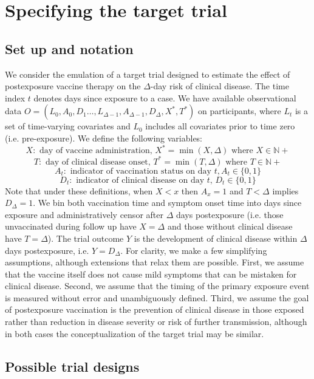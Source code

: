 \documentclass[11pt]{article}
\begin{document}

\section{Specifying the target trial}

\subsection{Set up and notation} \label{sec:setup}
We consider the emulation of a target trial designed to estimate the effect of postexposure vaccine therapy on the $\Delta$-day risk of clinical disease. The time index $t$ denotes days since exposure to a case. We have available observational data $O=\left(L_0, A_0, D_1 \ldots, L_{\Delta-1}, A_{\Delta-1}, D_{\Delta}, X^*, T^*\right)$ on participants, where $L_t$ is a set of time-varying covariates and $L_0$ includes all covariates prior to time zero (i.e. pre-exposure). We define the following variables:
$$X: \text{ day of vaccine administration, } X^* = \operatorname{min}(X, \Delta) \text{ where } X \in \mathbb{N}+$$
$$T: \text{ day of clinical disease onset, } T^* = \operatorname{min}(T, \Delta) \text{ where } T \in \mathbb{N}+$$
$$A_t: \text{ indicator of vaccination status on day }t, A_t \in \{0, 1\}$$
$$D_t: \text{ indicator of clinical disease on day $t$, } D_t \in \{0, 1\}$$
Note that under these definitions, when $X < x$ then $A_x = 1$ and $T < \Delta$ implies $D_{\Delta} = 1$. We bin both vaccination time and symptom onset time into days since exposure and administratively censor after $\Delta$ days postexposure (i.e. those unvaccinated during follow up have $X = \Delta$ and those without clinical disease have $T = \Delta$). The trial outcome $Y$ is the development of clinical disease within $\Delta$ days postexposure, i.e. $Y=D_{\Delta}$. For clarity, we make a few simplifying assumptions, although extensions that relax them are possible. First, we assume that the vaccine itself does not cause mild symptoms that can be mistaken for clinical disease. Second, we assume that the timing of the primary exposure event is measured without error and unambiguously defined. Third, we assume the goal of postexposure vaccination is the prevention of clinical disease in those exposed rather than reduction in disease severity or risk of further transmission, although in both cases the conceptualization of the target trial may be similar.

\subsection{Possible trial designs}
\end{document}
